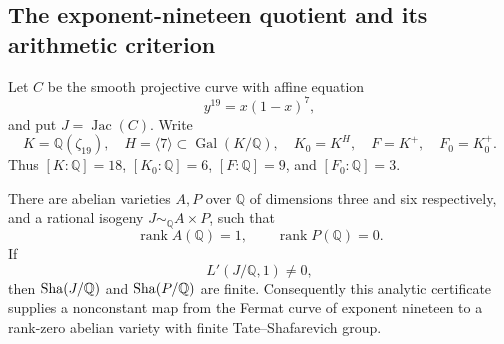 \subsection{The exponent-nineteen quotient and its arithmetic criterion}
\label{subsec:nineteen-arithmetic}

Let $C$ be the smooth projective curve with affine equation
\[
 y^{19}=x(1-x)^7,
\]
and put $J=\operatorname{Jac}(C)$.  Write
\[
 K=\mathbb Q(\zeta_{19}),\quad H=\langle7\rangle
 \subset\operatorname{Gal}(K/\mathbb Q),\quad
 K_0=K^H,\quad F=K^+,\quad F_0=K_0^+.
\]
Thus $[K:\mathbb Q]=18$, $[K_0:\mathbb Q]=6$,
$[F:\mathbb Q]=9$, and $[F_0:\mathbb Q]=3$.

\begin{proposition}
\label{prop:lm-nineteen-rankone}
There are abelian varieties $A,P$ over $\mathbb Q$ of dimensions
three and six respectively, and a rational isogeny
$J\sim_{\mathbb Q} A\times P$, such that
\[
 \operatorname{rank} A(\mathbb Q)=1,
 \qquad \operatorname{rank} P(\mathbb Q)=0.
\]
If
\[
 L'(J/\mathbb Q,1)\ne0,
\]
then $\operatorname{Sha}(J/\mathbb Q)$ and $\operatorname{Sha}(P/\mathbb Q)$ are finite.
Consequently this analytic certificate supplies a nonconstant map
from the Fermat curve of exponent nineteen to a rank-zero abelian
variety with finite Tate--Shafarevich group.
\end{proposition}


